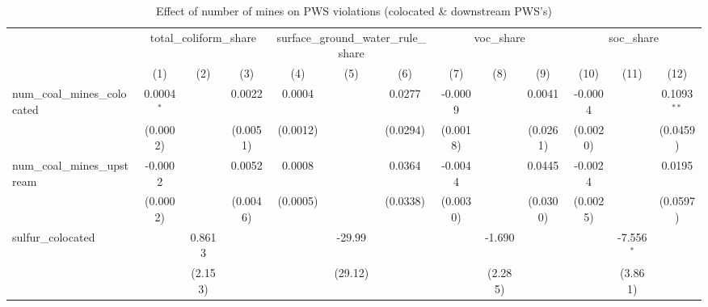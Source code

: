 
\begin{table}[htbp]
   \caption{\label{olsrf2sls_nummine_non_mine_vio_1985to2005_colocateddownstream} Effect of number of mines on PWS violations (colocated \& downstream PWS's)}
   \bigskip
   \centering
   \begin{adjustbox}{width = \textwidth, center}
      \begin{tabular}{lcccccccccccc}
         \toprule
          & \multicolumn{3}{c}{total\_coliform\_share} & \multicolumn{3}{c}{surface\_ground\_water\_rule\_share} & \multicolumn{3}{c}{voc\_share} & \multicolumn{3}{c}{soc\_share}\\
                                                            & (1)           & (2)           & (3)           & (4)           & (5)           & (6)           & (7)           & (8)           & (9)           & (10)          & (11)          & (12)\\  
         \midrule 
         num\_coal\_mines\_colocated                        & 0.0004$^{*}$  &               & 0.0022        & 0.0004        &               & 0.0277        & -0.0009       &               & 0.0041        & -0.0004       &               & 0.1093$^{**}$\\   
                                                            & (0.0002)      &               & (0.0051)      & (0.0012)      &               & (0.0294)      & (0.0018)      &               & (0.0261)      & (0.0020)      &               & (0.0459)\\   
         num\_coal\_mines\_upstream                         & -0.0002       &               & 0.0052        & 0.0008        &               & 0.0364        & -0.0044       &               & 0.0445        & -0.0024       &               & 0.0195\\   
                                                            & (0.0002)      &               & (0.0046)      & (0.0005)      &               & (0.0338)      & (0.0030)      &               & (0.0300)      & (0.0025)      &               & (0.0597)\\   
         sulfur\_colocated                                  &               & 0.8613        &               &               & -29.99        &               &               & -1.690        &               &               & -7.556$^{*}$  &   \\   
                                                            &               & (2.153)       &               &               & (29.12)       &               &               & (2.285)       &               &               & (3.861)       &   \\   

\end{tabular}
\end{adjustbox}
\end{table}

